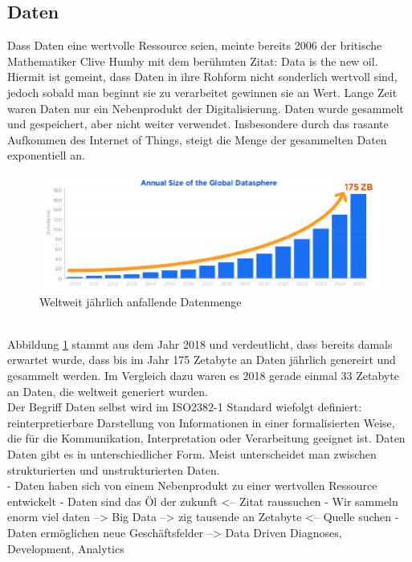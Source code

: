 \begin{onehalfspace}
    \subsection{Daten}
    \label{subsubsec:daten}
        Dass Daten eine wertvolle Ressource seien, meinte bereits 2006 der britische Mathematiker Clive Humby mit dem berühmten Zitat: \glqq{}Data is the new oil\grqq{}. Hiermit ist gemeint, dass Daten in ihre Rohform nicht sonderlich wertvoll sind, jedoch sobald man beginnt sie zu verarbeitet gewinnen sie an Wert. Lange Zeit waren Daten nur ein Nebenprodukt der Digitalisierung. Daten wurde gesammelt und gespeichert, aber nicht weiter verwendet. Insbesondere durch das rasante Aufkommen des Internet of Things, steigt  die Menge der gesammelten Daten exponentiell an.\cite{Otto2019}
        \begin{figure}[h]
            \centering
            \includegraphics[width = 15cm]{Bilder/Annual_Data_Size.png}
            \caption{Weltweit jährlich anfallende Datenmenge \cite{Reinsel2018}}
            \label{fig:DataSize}
        \end{figure} 
        \\
        Abbildung \ref{fig:DataSize} stammt aus dem Jahr 2018 und verdeutlicht, dass bereits damals erwartet wurde, dass bis im Jahr 175 Zetabyte an Daten jährlich genereirt und gesammelt werden. Im Vergleich dazu waren es 2018 gerade einmal 33 Zetabyte an Daten, die weltweit generiert wurden. \cite{Reinsel2018}
        \\
        Der Begriff Daten selbst wird im ISO2382-1 Standard wiefolgt definiert: \glqq{}reinterpretierbare Darstellung von Informationen in einer formalisierten Weise, die für die Kommunikation, Interpretation oder Verarbeitung geeignet ist\grqq{}. \cite{ISO2382} Daten Daten gibt es in unterschiedlicher Form. Meist unterscheidet man zwischen strukturierten und unstrukturierten Daten. 
        \\
        - Daten haben sich von einem Nebenprodukt zu einer wertvollen Ressource entwickelt
        - Daten sind das Öl der zukunft <-- Zitat raussuchen
        - Wir sammeln enorm viel daten --> Big Data --> zig tausende an Zetabyte <-- Quelle suchen
        - Daten ermöglichen neue Geschäftsfelder --> Data Driven Diagnoses, Development, Analytics


\end{onehalfspace}
